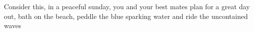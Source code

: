 Consider this, in a peaceful sunday, you and your best mates plan for a great day out, bath on the beach, peddle the blue sparking water and ride the uncontained waves 